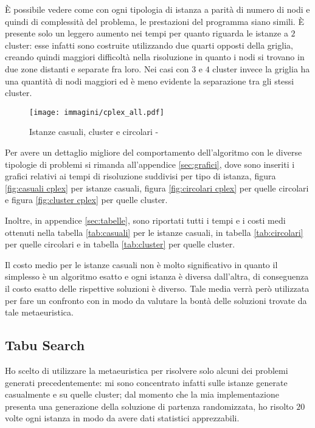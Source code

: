 È possibile vedere come con ogni tipologia di istanza a parità di numero di nodi e quindi di complessità del problema, le prestazioni del programma siano simili.
È presente solo un leggero aumento nei tempi per quanto riguarda le istanze a $2$ cluster: esse infatti sono costruite utilizzando due quarti opposti della griglia, creando quindi maggiori difficoltà nella risoluzione in quanto i nodi si trovano in due zone distanti e separate fra loro.
Nei casi con $3$ e $4$ cluster invece la griglia ha una quantità di nodi maggiori ed è meno evidente la separazione tra gli stessi cluster.

\begin{figure}[H]
	\centering
	\texttt{[image: immagini/cplex\_all.pdf]}
	\caption{Istanze casuali, cluster e circolari - }
	\label{fig:all cplex}
\end{figure}

Per avere un dettaglio migliore del comportamento dell'algoritmo con le diverse tipologie di problemi si rimanda all'appendice \ref{sec:grafici}, dove sono inseriti i grafici relativi ai tempi di risoluzione suddivisi per tipo di istanza, figura \ref{fig:casuali cplex} per istanze casuali, figura \ref{fig:circolari cplex} per quelle circolari e figura \ref{fig:cluster cplex} per quelle cluster.

Inoltre, in appendice \ref{sec:tabelle}, sono riportati tutti i tempi e i costi medi ottenuti nella tabella \ref{tab:casuali} per le istanze casuali, in tabella \ref{tab:circolari} per quelle circolari e in tabella \ref{tab:cluster} per quelle cluster.

Il costo medio per le istanze casuali non è molto significativo in quanto il simplesso è un algoritmo esatto e ogni istanza è diversa dall'altra, di conseguenza il costo esatto delle rispettive soluzioni è diverso.
Tale media verrà però utilizzata per fare un confronto con \tabu in modo da valutare la bontà delle soluzioni trovate da tale metaeuristica.


\subsection{Tabu Search}

Ho scelto di utilizzare la metaeuristica \tabu per risolvere solo alcuni dei problemi generati precedentemente: mi sono concentrato infatti sulle istanze generate casualmente e su quelle cluster; dal momento che la mia implementazione presenta una generazione della soluzione di partenza randomizzata, ho risolto $20$ volte ogni istanza in modo da avere dati statistici apprezzabili.

